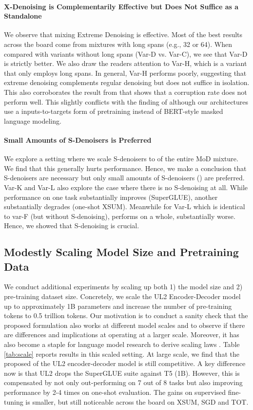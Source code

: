 \documentclass[10pt]{article}
\begin{document}
\paragraph{X-Denoising is Complementarily Effective but Does Not Suffice as a Standalone}
We observe that mixing Extreme Denoising is effective. Most of the best results across the board come from mixtures with long spans (e.g., 32 or 64). When compared with variants without long spans (Var-D vs. Var-C), we see that Var-D is strictly better. We also draw the readers attention to Var-H, which is a variant that only employs long spans. In general, Var-H performs poorly, suggesting that extreme denoising complements regular denoising but does not suffice in isolation. This also corroborates the result from \cite{raffel2019exploring} that shows that a  corruption rate does not perform well. This slightly conflicts with the finding of \citep{wettig2022should} although our architectures use a inputs-to-targets form of pretraining instead of BERT-style masked language modeling. 

\paragraph{Small Amounts of S-Denoisers is Preferred} We explore a setting where we scale S-denoisers to  of the entire MoD mixture. We find that this generally hurts performance. Hence, we make a conclusion that S-denoisers are necessary but only small amounts of S-denoisers () are preferred. Var-K and Var-L also explore the case where there is no S-denoising at all. While performance on one task substantially improves (SuperGLUE), another substantially degrades (one-shot XSUM). Meanwhile for Var-L which is identical to var-F (but without S-denoising), performs on a whole, substantially worse. Hence, we showed that S-denoising is crucial.



\subsection{Modestly Scaling Model Size and Pretraining Data}
We conduct additional experiments by scaling up both 1) the model size and 2) pre-training dataset size. Concretely, we scale the UL2 Encoder-Decoder model up to approximately 1B parameters and increase the number of pre-training tokens to 0.5 trillion tokens. Our motivation is to conduct a sanity check that the proposed formulation also works at different model scales and to observe if there are differences and implications at operating at a larger scale. Moreover, it has also become a staple for language model research to derive scaling laws \citep{kaplan2020scaling,tay2021scale}. Table \ref{tab:scale} reports results in this scaled setting. At large scale, we find that the proposed of the UL2 encoder-decoder model is still competitive. A key difference now is that UL2 drops the SuperGLUE suite against T5 (1B). However, this is compensated by not only out-performing on 7 out of 8 tasks but also improving performance by 2-4 times on one-shot evaluation. The gains on supervised fine-tuning is smaller, but still noticeable across the board on XSUM, SGD and TOT.
\end{document}
